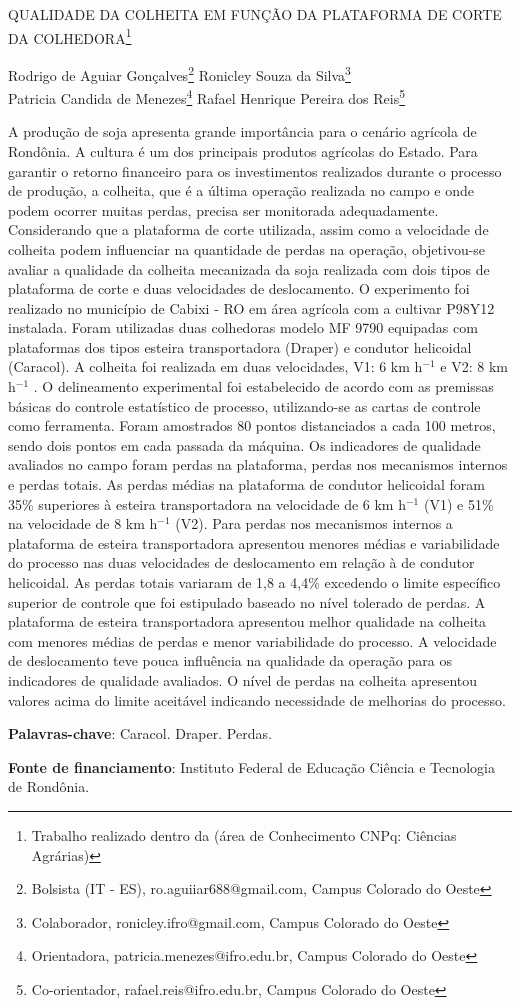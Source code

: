 \documentclass[article,12pt,onesidea,4paper,english,brazil]{abntex2}
\begin{document}
	
	
	\frenchspacing 
	
	\begin{center}
		\LARGE QUALIDADE DA COLHEITA EM FUNÇÃO DA PLATAFORMA DE CORTE DA COLHEDORA\footnote{Trabalho realizado dentro da (área de Conhecimento CNPq: Ciências Agrárias)}
		
		\normalsize
		Rodrigo de Aguiar Gonçalves\footnote{Bolsista (IT - ES), ro.aguiiar688@gmail.com, Campus Colorado do Oeste} 
		Ronicley Souza da Silva\footnote{Colaborador, ronicley.ifro@gmail.com, Campus Colorado do Oeste} \\
		Patricia Candida de Menezes\footnote{Orientadora, patricia.menezes@ifro.edu.br, Campus Colorado do Oeste} 
		Rafael
		Henrique Pereira dos Reis\footnote{Co-orientador, rafael.reis@ifro.edu.br, Campus Colorado do Oeste} 
	\end{center}
	
	\noindent A produção de soja apresenta grande importância para o cenário agrícola de
	Rondônia. A cultura é um dos principais produtos agrícolas do Estado. Para garantir
	o retorno financeiro para os investimentos realizados durante o processo de
	produção, a colheita, que é a última operação realizada no campo e onde podem
	ocorrer muitas perdas, precisa ser monitorada adequadamente. Considerando que a
	plataforma de corte utilizada, assim como a velocidade de colheita podem influenciar
	na quantidade de perdas na operação, objetivou-se avaliar a qualidade da colheita
	mecanizada da soja realizada com dois tipos de plataforma de corte e duas
	velocidades de deslocamento. O experimento foi realizado no município de Cabixi -
	RO em área agrícola com a cultivar P98Y12 instalada. Foram utilizadas duas
	colhedoras modelo MF 9790 equipadas com plataformas dos tipos esteira
	transportadora (Draper) e condutor helicoidal (Caracol). A colheita foi realizada em
	duas velocidades, V1: 6 km h$^{-1}$ e V2: 8 km h$^{-1}$
	. O delineamento experimental foi
	estabelecido de acordo com as premissas básicas do controle estatístico de
	processo, utilizando-se as cartas de controle como ferramenta. Foram amostrados
	80 pontos distanciados a cada 100 metros, sendo dois pontos em cada passada da
	máquina. Os indicadores de qualidade avaliados no campo foram perdas na
	plataforma, perdas nos mecanismos internos e perdas totais. As perdas médias na
	plataforma de condutor helicoidal foram 35\% superiores à esteira transportadora na
	velocidade de 6 km h$^{-1}$
	(V1) e 51\% na velocidade de 8 km h$^{-1}$ (V2). Para perdas nos
	mecanismos internos a plataforma de esteira transportadora apresentou menores
	médias e variabilidade do processo nas duas velocidades de deslocamento em
	relação à de condutor helicoidal. As perdas totais variaram de 1,8 a 4,4\% excedendo
	o limite específico superior de controle que foi estipulado baseado no nível tolerado
	de perdas. A plataforma de esteira transportadora apresentou melhor qualidade na
	colheita com menores médias de perdas e menor variabilidade do processo. A
	velocidade de deslocamento teve pouca influência na qualidade da operação para
	os indicadores de qualidade avaliados. O nível de perdas na colheita apresentou
	valores acima do limite aceitável indicando necessidade de melhorias do processo.
	
	\vspace{\onelineskip}
	
	\noindent
	\textbf{Palavras-chave}: Caracol. Draper. Perdas.
	
	\noindent
	\textbf{Fonte de financiamento}: Instituto Federal de Educação Ciência e Tecnologia de
	Rondônia.
	
\end{document}
